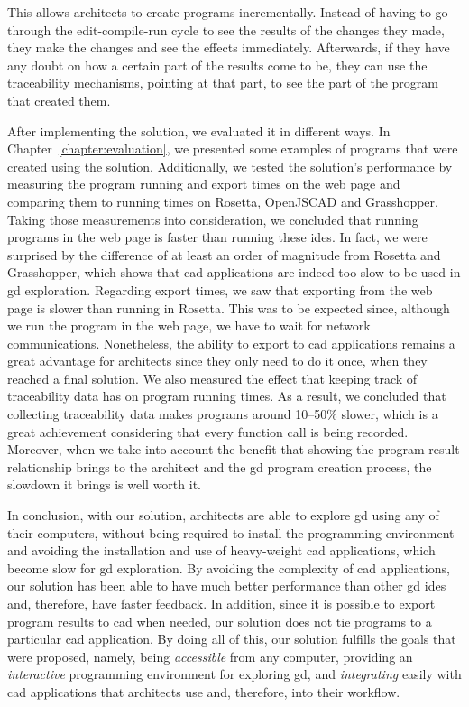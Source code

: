 This allows architects to create programs incrementally.
Instead of having to go through the edit-compile-run cycle to see the results of the changes they made, they make the changes and see the effects immediately.
Afterwards, if they have any doubt on how a certain part of the results come to be, they can use the traceability mechanisms, pointing at that part, to see the part of the program that created them.

After implementing the solution, we evaluated it in different ways.
In Chapter~\ref{chapter:evaluation}, we presented some examples of programs that were created using the solution.
Additionally, we tested the solution's performance by measuring the program running and export times on the web page and comparing them to running times on Rosetta, OpenJSCAD and Grasshopper.
Taking those measurements into consideration, we concluded that running programs in the web page is faster than running these \glspl{ide}.
In fact, we were surprised by the difference of at least an order of magnitude from Rosetta and Grasshopper, which shows that \gls{cad} applications are indeed too slow to be used in \gls{gd} exploration.
Regarding export times, we saw that exporting from the web page is slower than running in Rosetta.
This was to be expected since, although we run the program in the web page, we have to wait for network communications.
Nonetheless, the ability to export to \gls{cad} applications remains a great advantage for architects since they only need to do it once, when they reached a final solution.
We also measured the effect that keeping track of traceability data has on program running times.
As a result, we concluded that collecting traceability data makes programs around 10--50\% slower, which is a great achievement considering that every function call is being recorded.
Moreover, when we take into account the benefit that showing the program-result relationship brings to the architect and the \gls{gd} program creation process, the slowdown it brings is well worth it.

In conclusion, with our solution, architects are able to explore \gls{gd} using any of their computers, without being required to install the programming environment and avoiding the installation and use of heavy-weight \gls{cad} applications, which become slow for \gls{gd} exploration.
By avoiding the complexity of \gls{cad} applications, our solution has been able to have much better performance than other \gls{gd} \glspl{ide} and, therefore, have faster feedback.
In addition, since it is possible to export program results to \gls{cad} when needed, our solution does not tie programs to a particular \gls{cad} application.
By doing all of this, our solution fulfills the goals that were proposed, namely, being \textit{accessible} from any computer, providing an \textit{interactive} programming environment for exploring \gls{gd}, and \textit{integrating} easily with \gls{cad} applications that architects use and, therefore, into their workflow.

